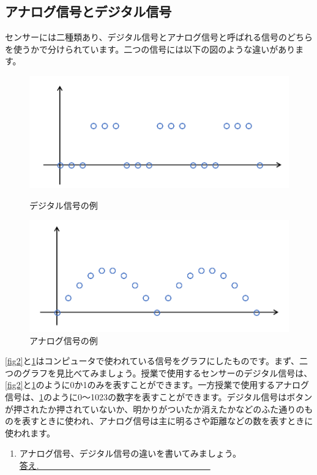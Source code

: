 \subsection{アナログ信号とデジタル信号}
センサーには二種類あり、デジタル信号とアナログ信号と呼ばれる信号のどちらを使うかで分けられています。二つの信号には以下の図のような違いがあります。

\begin{figure}[htbp]
  \begin{minipage}[b]{0.45\linewidth}
    \centering
    \includegraphics[keepaspectratio, scale=0.4]{images/chap05/text05-img002.png}
    \caption{デジタル信号の例}
    \label{fig2}
  \end{minipage}
  \begin{minipage}[b]{0.45\linewidth}
    \centering
    \includegraphics[keepaspectratio, scale=0.4]{images/chap05/text05-img003.png}
    \caption{アナログ信号の例}
    \label{fig3}
  \end{minipage}
\end{figure}

\ref{fig2}と\ref{fig3}はコンピュータで使われている信号をグラフにしたものです。まず、二つのグラフを見比べてみましょう。授業で使用するセンサーのデジタル信号は、\ref{fig2}と\ref{fig3}のように0か1のみを表すことができます。一方授業で使用するアナログ信号は、\ref{fig3}のように0〜1023の数字を表すことができます。デジタル信号はボタンが押されたか押されていないか、明かりがついたか消えたかなどのふた通りのものを表すときに使われ、アナログ信号は主に明るさや距離などの数を表すときに使われます。\\

\begin{tcolorbox}[title=\useOmetoi]
\begin{enumerate}
\item アナログ信号、デジタル信号の違いを書いてみましょう。\\
\underline{答え.　　　　　　　　　　　　　　　　　　　　}
\end{enumerate}
\end{tcolorbox}














